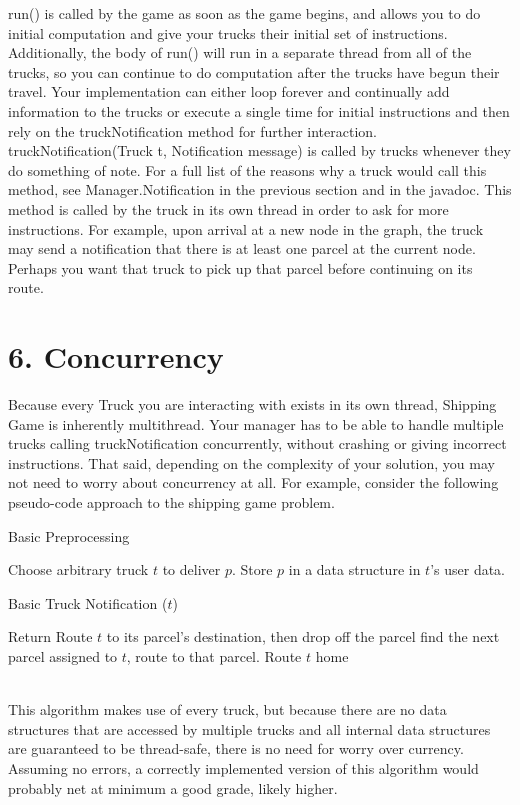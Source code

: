\documentclass[11pt]{article}
\begin{document}
run() is called by the game as soon as the game begins, and allows you to do initial computation and give your trucks their initial set of instructions. Additionally, the body of run() will run in a separate thread from all of the trucks, so you can continue to do computation after the trucks have begun their travel. Your implementation can either loop forever and continually add information to the trucks or execute a single time for initial instructions and then rely on the truckNotification method for further interaction.\\

truckNotification(Truck t, Notification message) is called by trucks whenever they do something of note. For a full list of the reasons why a truck would call this method, see Manager.Notification in the previous section and in the javadoc. This method is called by the truck in its own thread in order to ask for more instructions. For example, upon arrival at a new node in the graph, the truck may send a notification that there is at least one parcel at the current node. Perhaps you want that truck to pick up that parcel before continuing on its route.

\newpage
\section{6. Concurrency}
Because every Truck you are interacting with exists in its own thread, Shipping Game is inherently multithread. Your manager has to be able to handle multiple trucks calling truckNotification concurrently, without crashing or giving incorrect instructions. That said, depending on the complexity of your solution, you may not need to worry about concurrency at all. For example, consider the following pseudo-code approach to the shipping game problem.
\begin{algorithm}
\caption{Basic Preprocessing} \label{alg:ls}
\begin{algorithmic}[1]
\STATE Choose arbitrary truck $t$ to deliver $p$. Store $p$ in a data structure in $t$'s user data.
\ENDFOR
\end{algorithmic}
\end{algorithm}
\begin{algorithm}
\caption{Basic Truck Notification ($t$)} \label{alg:ls}
\begin{algorithmic}[1]
\STATE Return
\ENDIF
{}
\STATE Route $t$ to its parcel's destination, then drop off the parcel
\ELSE
\STATE find the next parcel assigned to $t$, route to that parcel.
\ENDIF
\ELSE
\STATE Route $t$ home
\ENDIF
\end{algorithmic}
\end{algorithm}
\\This algorithm makes use of every truck, but because there are no data structures that are accessed by multiple trucks and all internal data structures are guaranteed to be thread-safe, there is no need for worry over currency. Assuming no errors, a correctly implemented version of this algorithm  would probably net at minimum a good grade, likely higher.\\
\end{document}
